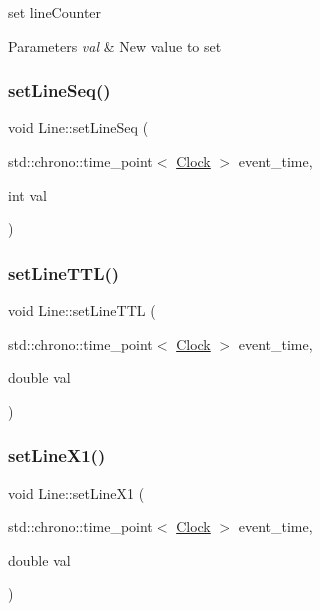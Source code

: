 set line\+Counter 
\begin{DoxyParams}{Parameters}
{\em val} & New value to set \\
\hline
\end{DoxyParams}
\mbox{\label{classLine_a7c315c5ffdd4fa875918583738e2e157}} 
\subsubsection{\texorpdfstring{set\+Line\+Seq()}{setLineSeq()}}
{\footnotesize\ttfamily void Line\+::set\+Line\+Seq (\begin{DoxyParamCaption}\item[{std\+::chrono\+::time\+\_\+point$<$ \mbox{\hyperlink{universe_8h_a0ef8d951d1ca5ab3cfaf7ab4c7a6fd80}{Clock}} $>$}]{event\+\_\+time,  }\item[{int}]{val }\end{DoxyParamCaption})\hspace{0.3cm}{\ttfamily [inline]}}

\mbox{\label{classLine_a602398c8c3131ec7236ccadbab8281d5}} 
\subsubsection{\texorpdfstring{set\+Line\+T\+T\+L()}{setLineTTL()}}
{\footnotesize\ttfamily void Line\+::set\+Line\+T\+TL (\begin{DoxyParamCaption}\item[{std\+::chrono\+::time\+\_\+point$<$ \mbox{\hyperlink{universe_8h_a0ef8d951d1ca5ab3cfaf7ab4c7a6fd80}{Clock}} $>$}]{event\+\_\+time,  }\item[{double}]{val }\end{DoxyParamCaption})\hspace{0.3cm}{\ttfamily [inline]}}

\mbox{\label{classLine_ab8df9f66bffc86994db3150a4eb8ed29}} 
\subsubsection{\texorpdfstring{set\+Line\+X1()}{setLineX1()}}
{\footnotesize\ttfamily void Line\+::set\+Line\+X1 (\begin{DoxyParamCaption}\item[{std\+::chrono\+::time\+\_\+point$<$ \mbox{\hyperlink{universe_8h_a0ef8d951d1ca5ab3cfaf7ab4c7a6fd80}{Clock}} $>$}]{event\+\_\+time,  }\item[{double}]{val }\end{DoxyParamCaption})\hspace{0.3cm}{\ttfamily [inline]}}

